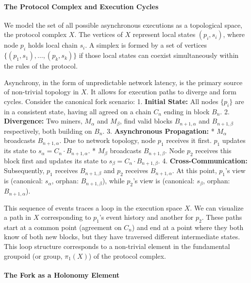\documentclass[
]{article}
\begin{document}
\paragraph{The Protocol Complex and Execution
Cycles}\label{the-protocol-complex-and-execution-cycles}

We model the set of all possible asynchronous executions as a
topological space, the protocol complex \(X\). The vertices of \(X\)
represent local states \((p_i, s_i)\), where node \(p_i\) holds local
chain \(s_i\). A simplex is formed by a set of vertices
\(\{(p_1, s_1), \dots, (p_k, s_k)\}\) if those local states can coexist
simultaneously within the rules of the protocol.

Asynchrony, in the form of unpredictable network latency, is the primary
source of non-trivial topology in \(X\). It allows for execution paths
to diverge and form cycles. Consider the canonical fork scenario: 1.
\textbf{Initial State:} All nodes \(\{p_i\}\) are in a consistent state,
having all agreed on a chain \(C_n\) ending in block \(B_n\). 2.
\textbf{Divergence:} Two miners, \(M_\alpha\) and \(M_\beta\), find
valid blocks \(B_{n+1, \alpha}\) and \(B_{n+1, \beta}\) respectively,
both building on \(B_n\). 3. \textbf{Asynchronous Propagation:} *
\(M_\alpha\) broadcasts \(B_{n+1, \alpha}\). Due to network topology,
node \(p_1\) receives it first. \(p_1\) updates its state to
\(s_\alpha = C_n \cdot B_{n+1, \alpha}\). * \(M_\beta\) broadcasts
\(B_{n+1, \beta}\). Node \(p_2\) receives this block first and updates
its state to \(s_\beta = C_n \cdot B_{n+1, \beta}\). 4.
\textbf{Cross-Communication:} Subsequently, \(p_1\) receives
\(B_{n+1, \beta}\) and \(p_2\) receives \(B_{n+1, \alpha}\). At this
point, \(p_1\)'s view is (canonical: \(s_\alpha\), orphan:
\(B_{n+1, \beta}\)), while \(p_2\)'s view is (canonical: \(s_\beta\),
orphan: \(B_{n+1, \alpha}\)).

This sequence of events traces a loop in the execution space \(X\). We
can visualize a path in \(X\) corresponding to \(p_1\)'s event history
and another for \(p_2\). These paths start at a common point (agreement
on \(C_n\)) and end at a point where they both know of both new blocks,
but they have traversed different intermediate states. This loop
structure corresponds to a non-trivial element in the fundamental
groupoid (or group, \(\pi_1(X)\)) of the protocol complex.

\paragraph{The Fork as a Holonomy
Element}\label{the-fork-as-a-holonomy-element}
\end{document}
